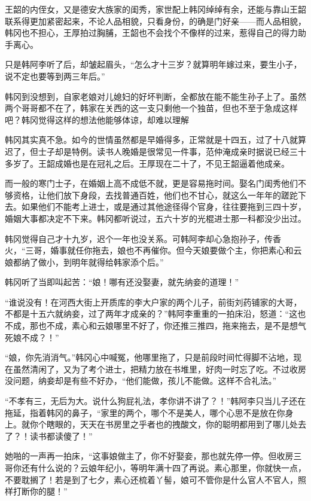 王韶的内侄女，又是德安大族家的闺秀，家世配上韩冈绰绰有余，还能与靠山王韶联系得更加紧密起来，不论人品相貌，只看身份，的确是门好亲——而人品相貌，韩冈也不担心，王厚拍过胸脯，王韶也不会找个不像样的过来，惹得自己的得力助手离心。

只是韩阿李听了后，却皱起眉头，“怎么才十三岁？就算明年嫁过来，要生小子，说不定也要等到两三年后。”

韩冈到没想到，自家老娘对儿媳妇的好坏判断，全都放在能不能生孙子上了。虽然两个哥哥都不在了，韩家在关西的这一支只剩他一个独苗，但也不至于急成这样吧？韩冈觉得这样的想法他能够体谅，却难以理解

韩冈其实真不急。如今的世情虽然都是早婚得多，正常就是十四五，过了十八就算迟了，但士子却是特例。读书人晚婚是很常见一件事，范仲淹成亲时据说已经三十多岁了。王韶成婚也是在冠礼之后。王厚现在二十了，不见王韶逼着他成亲。

而一般的寒门士子，在婚姻上高不成低不就，更是容易拖时间。娶名门闺秀他们不够资格，让他们放下身段，去找普通百姓，他们也不甘心，就这么一年年的蹉跎下去。如果他们不能考上进士，或是通过其他途径得个官身，往往要拖到三四十岁，婚姻大事都决定不下来。韩冈都听说过，五六十岁的光棍进士那一科都没少出过。

韩冈觉得自己才十九岁，迟个一年也没关系。可韩阿李却心急抱孙子，传香火，“三哥，婚事就任你拖去，娘也不再催你。但今天娘要做个主，你把素心和云娘都纳了做小，到明年就得给韩家添个后。”

韩冈听了当即叫起苦：“娘！哪有还没娶妻，就先纳妾的道理！”

“谁说没有！在河西大街上开质库的李大户家的两个儿子，前街刘药铺家的大哥，不都是十五六就纳妾，过了两年才成亲的？”韩阿李重重的一拍床沿，怒道：“这也不成，那也不成，素心和云娘哪里不好了，你还推三推四，拖来拖去，是不是想气死娘不成？！”

“娘，你先消消气。”韩冈心中喊冤，他哪里拖了，只是前段时间忙得脚不沾地，现在虽然清闲了，又为了考个进士，把精力放在书堆里，好肉一时忘了吃。不过收房没问题，纳妾却是有些不好办，“他们能做，孩儿不能做。这样不合礼法。”

“不孝有三，无后为大。说什么狗屁礼法，孝你讲不讲了？！”韩阿李只当儿子还在拖延，指着韩冈的鼻子，“家里的两个，哪个不是美人，哪个心思不是放在你身上。就你个瞎眼的，天天在书房里之乎者也的拽酸文，你的聪明都用到了哪儿处去了？！读书都读傻了！”

她啪的一声再一拍床，“这事娘做主了，你不好娶妾，那也就先停一停。但收房三哥你还有什么说的？云娘年纪小，等明年满十四了再说。素心那里，你就快一点，不要耽搁了！若是到了七夕，素心还梳着丫髻，娘可不管你是什么官人不官人，照样打断你的腿！”

